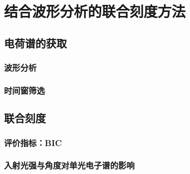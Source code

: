 
\chapter{结合波形分析的联合刻度方法}

\section{电荷谱的获取}

\subsection{波形分析}

\subsection{时间窗筛选}

\section{联合刻度}

\subsection{评价指标：BIC}

\subsection{入射光强与角度对单光电子谱的影响}
